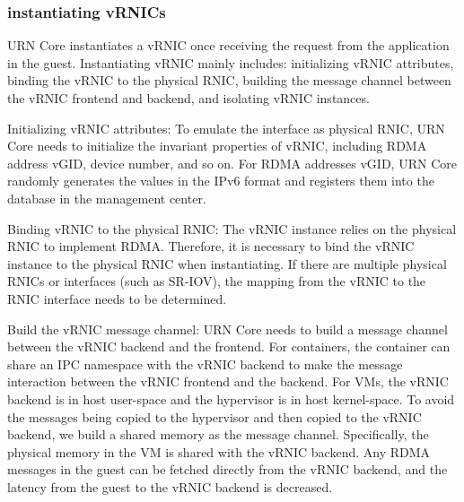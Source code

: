 \subsubsection{instantiating vRNICs}
URN Core instantiates a vRNIC once receiving the request from the application in the guest. Instantiating vRNIC mainly includes: initializing vRNIC attributes, binding the vRNIC to the physical RNIC, building the message channel between the vRNIC frontend and backend, and isolating vRNIC instances.

Initializing vRNIC attributes: To emulate the interface as physical RNIC, URN Core needs to initialize the invariant properties of vRNIC, including RDMA address vGID, device number, and so on. For RDMA addresses vGID, URN Core randomly generates the values in the IPv6 format and registers them into the database in the management center.

Binding vRNIC to the physical RNIC: The vRNIC instance relies on the physical RNIC to implement RDMA. Therefore, it is necessary to bind the vRNIC instance to the physical RNIC when instantiating. If there are multiple physical RNICs or interfaces (such as SR-IOV), the mapping from the vRNIC to the RNIC interface needs to be determined.

Build the vRNIC message channel: URN Core needs to build a message channel between the vRNIC backend and the frontend. For containers, the container can share an IPC namespace with the vRNIC backend to make the message interaction between the vRNIC frontend and the backend. For VMs, the vRNIC backend is in host user-space and the hypervisor is in host kernel-space. To avoid the messages being copied to the hypervisor and then copied to the vRNIC backend, we build a shared memory as the message channel. Specifically, the physical memory in the VM is shared with the vRNIC backend. Any RDMA messages in the guest can be fetched directly from the vRNIC backend, and the latency from the guest to the vRNIC backend is decreased.

